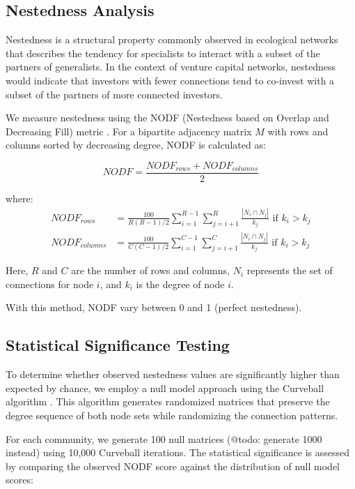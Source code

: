 \documentclass[12pt]{article}
\begin{document}
\subsection{Nestedness Analysis}

Nestedness is a structural property commonly observed in ecological networks \cite{AlmeidaNeto2008} that describes the tendency for specialists to interact with a subset of the partners of generalists. In the context of venture capital networks, nestedness would indicate that investors with fewer connections tend to co-invest with a subset of the partners of more connected investors.

We measure nestedness using the NODF (Nestedness based on Overlap and Decreasing Fill) metric \cite{AlmeidaNeto2008}. For a bipartite adjacency matrix $M$ with rows and columns sorted by decreasing degree, NODF is calculated as:

\begin{equation}
NODF = \frac{NODF_{rows} + NODF_{columns}}{2}
\end{equation}

where:
\begin{align}
NODF_{rows} &= \frac{100}{R(R-1)/2} \sum_{i=1}^{R-1} \sum_{j=i+1}^{R} \frac{|N_i \cap N_j|}{k_j} \text{ if } k_i > k_j \\
NODF_{columns} &= \frac{100}{C(C-1)/2} \sum_{i=1}^{C-1} \sum_{j=i+1}^{C} \frac{|N_i \cap N_j|}{k_j} \text{ if } k_i > k_j
\end{align}

Here, $R$ and $C$ are the number of rows and columns, $N_i$ represents the set of connections for node $i$, and $k_i$ is the degree of node $i$.

With this method, NODF vary between 0 and 1 (perfect nestedness).

\subsection{Statistical Significance Testing}

To determine whether observed nestedness values are significantly higher than expected by chance, we employ a null model approach using the Curveball algorithm \cite{Strona2014}. This algorithm generates randomized matrices that preserve the degree sequence of both node sets while randomizing the connection patterns.

For each community, we generate 100 null matrices (@todo: generate 1000 instead) using 10,000 Curveball iterations. The statistical significance is assessed by comparing the observed NODF score against the distribution of null model scores:
\end{document}
